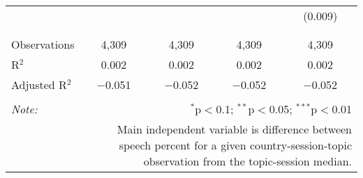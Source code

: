 \begin{table}[!htbp]
\begin{tabular}{@{\extracolsep{5pt}}lcccc}
  &  &  &  & (0.009) \\ 
  & & & & \\ 
\hline \\[-1.8ex] 
Observations & 4,309 & 4,309 & 4,309 & 4,309 \\ 
R$^{2}$ & 0.002 & 0.002 & 0.002 & 0.002 \\ 
Adjusted R$^{2}$ & $-$0.051 & $-$0.052 & $-$0.052 & $-$0.052 \\ 
\hline 
\hline \\[-1.8ex] 
\textit{Note:}  & \multicolumn{4}{r}{$^{*}$p$<$0.1; $^{**}$p$<$0.05; $^{***}$p$<$0.01} \\ 
 & \multicolumn{4}{r}{Main independent variable is difference between speech percent for a given country-session-topic observation from the topic-session median.} \\ 
\end{tabular} 
\end{table} 
